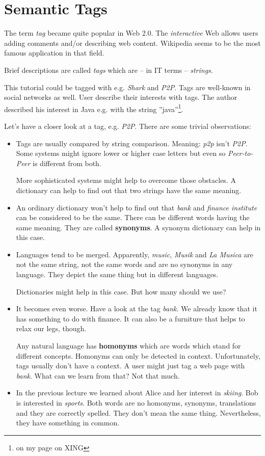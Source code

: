 \chapter{Semantic Tags}
The term {\it tag} became quite popular in Web 2.0. The {\it interactive} Web allows users adding comments and/or describing web content. Wikipedia seems to be the most famous application in that field. 

Brief descriptions are called {\it tags} which are -- in IT terms -- {\it strings}.

This tutorial could be tagged with e.g. {\it Shark} and {\it P2P}.
Tags are well-known in social networks as well. User describe their interests with tags. The author described his interest in Java e.g. with the string ''java''\footnote{on my page on XING}.

Let's have a closer look at a tag, e.g. {\it P2P}. There are some trivial observations:

\begin{itemize}
\item 
Tags are usually compared by string comparison. Meaning: {\it p2p} isn't {\it P2P}. Some systems might ignore lower or higher case letters but even so {\it Peer-to-Peer} is different from both. 

More sophisticated systems might help to overcome those obstacles. A dictionary can help to find out that two strings have the same meaning.

\item
An ordinary dictionary won't help to find out that {\it bank} and {\it finance institute} can be considered to be the same. There can be different words having the same meaning. They are called {\bf synonyms}. A synonym dictionary can help in this case.

\item
Languages tend to be merged. Apparently, {\it music}, {\it Musik} and {\it La Musica} are not the same string, not the same words and are no synonyms in any language. They depict the same thing but in different languages.

Dictionaries might help in this case. But how many should we use?

\item
It becomes even worse. Have a look at the tag {\it bank}. We already know that it has something to do with finance. It can also be a furniture that helps to relax our legs, though. 

Any natural language has {\bf homonyms} which are words which stand for different concepts. Homonyms can only be detected in context. Unfortunately, tags usually don't have a context. A user might just tag a web page with {\it bank}. What can we learn from that? Not that much.

\item
In the previous lecture we learned about Alice and her interest in {\it skiing}.
Bob is interested in {\it sports}. Both words are no homonyms, synonyms, translations and they are correctly spelled. They don't mean the same thing. Nevertheless, they have something in common.

\end{itemize}

